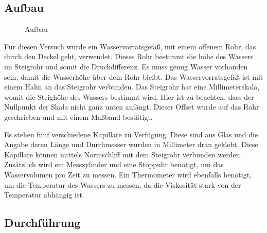 \documentclass[11pt,a4paper]{article}
\begin{document}
\pagebreak

\subsection{Aufbau}

\begin{figure}[ht]
\centering
{}
   \renewcommand\thefigure{B1}
\caption[Aufbau]{Aufbau \cite{Anleitung}}
\label{Pic:1}
\end{figure}

Für diesen Versuch wurde ein Wasservorratsgefäß, mit einem offenem Rohr, das durch den Deckel geht, verwendet. Dieses Rohr bestimmt die höhe des Wassers im Steigrohr und somit die Druckdifferenz. Es muss genug Wasser vorhanden sein, damit die Wasserhöhe über dem Rohr bleibt. Das Wasservorratsgefäß ist mit einem Hahn an das Steigrohr verbunden. Das Steigrohr hat eine Millimeterskala, womit die Steighöhe des Wassers bestimmt wird. Hier ist zu beachten, dass der Nullpunkt der Skala nicht ganz unten anfängt. Dieser Offset wurde auf das Rohr geschrieben und mit einem Maßband bestätigt. 

Es stehen fünf verschiedene Kapillare zu Verfügung. Diese sind aus Glas und die Angabe deren Länge und Durchmesser wurden in Millimeter dran geklebt. Diese Kapillare können mittels Normschliff mit dem Steigrohr verbunden werden. Zusätzlich wird ein Messzylinder und eine Stoppuhr benötigt, um das Wasservolumen pro Zeit zu messen. Ein Thermometer wird ebenfalls benötigt, um die Temperatur des Wassers zu messen, da die Viskosität stark von der Temperatur abhängig ist.

\pagebreak

\subsection{Durchführung}
\end{document}
